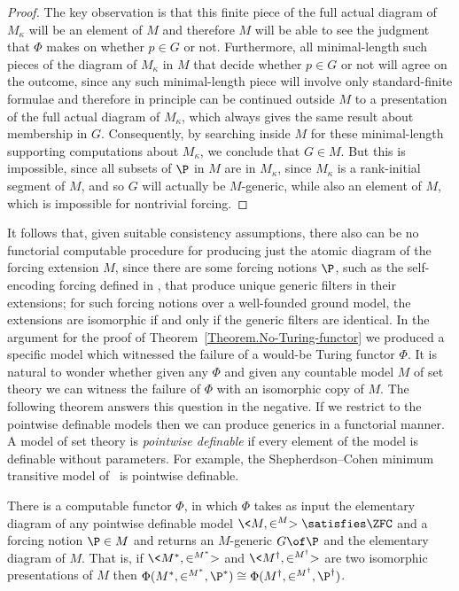 \documentclass{amsart}
\begin{document}
\begin{proof}
The key observation is that this finite piece of the full actual diagram of $M_\kappa$ will be an element of $M$ and therefore $M$ will be able to see the judgment that $\Phi$ makes on whether $p\in G$ or not. Furthermore, all minimal-length such pieces of the diagram of $M_\kappa$ in $M$ that decide whether $p\in G$ or not will agree on the outcome, since any such minimal-length piece will involve only standard-finite formulae and therefore in principle can be continued outside $M$ to a presentation of the full actual diagram of $M_\kappa$, which always gives the same result about membership in $G$. Consequently, by searching inside $M$ for these minimal-length supporting computations about $M_\kappa$, we conclude that $G\in M$.
But this is impossible, since all subsets of $\P$ in $M$ are in $M_\kappa$, since $M_\kappa$ is a rank-initial segment of $M$, and so $G$ will actually be $M$-generic, while also an element of $M$, which is impossible for nontrivial forcing.
\end{proof}
It follows that, given suitable consistency assumptions, there also can be no functorial computable procedure for producing just the atomic diagram of the forcing extension $M$, since there are some forcing notions $\P$, such as the self-encoding forcing defined in \cite{FuchsHamkinsReitz2015:Set-theoreticGeology}, that produce unique generic filters in their extensions; for such forcing notions over a well-founded ground model, the extensions are isomorphic if and only if the generic filters are identical.
In the argument for the proof of Theorem~\ref{Theorem.No-Turing-functor} we produced a specific model which witnessed the failure of a would-be Turing functor $\Phi$. It is natural to wonder whether given any $\Phi$ and given any countable model $M$ of set theory we can witness the failure of $\Phi$ with an isomorphic copy of $M$.
The following theorem answers this question in the negative. If we restrict to the pointwise definable models then we can produce generics in a functorial manner. A model of set theory is \emph{pointwise definable} if every element of the model is definable without parameters. For example, the Shepherdson--Cohen minimum transitive model of \ZF\ is pointwise definable.
\begin{theorem}
There is a computable functor $\Phi$, in which $\Phi$ takes as input the elementary diagram of any pointwise definable model $\<M,\in^M> \satisfies \ZFC$ and a forcing notion $\P \in M$ and returns an $M$-generic $G \of \P$ and the elementary diagram of $M$. That is, if $\<M^*,\in^{M^*}>$ and $\<M^\dagger,\in^{M^\dagger}>$ are two isomorphic presentations of $M$ then $\Phi(M^*,\in^{M^*},\P^*) \cong \Phi(M^\dagger,\in^{M^\dagger},\P^\dagger)$.
\end{theorem}
\end{document}
